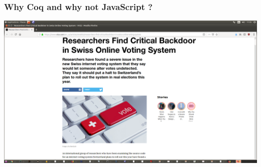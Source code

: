 \documentclass{beamer}
\begin{document}
\begin{frame}
\frametitle{Why Coq and why not JavaScript ?}
\begin{center}
\includegraphics[scale=0.15]{swisspost.png}
\end{center}
\end{frame}




\end{document}
